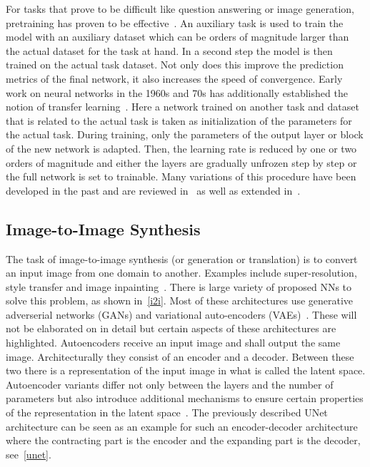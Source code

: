 For tasks that prove to be difficult like question answering or image generation, pretraining has proven to be effective~\autocite{radford_improving_nodate, wang_pretraining_2022}.
An auxiliary task is used to train the model with an auxiliary dataset which can be orders of magnitude larger than the actual dataset for the task at hand.
In a second step the model is then trained on the actual task dataset.
Not only does this improve the prediction metrics of the final network, it also increases the speed of convergence.
Early work on neural networks in the 1960s and 70s has additionally established the notion of transfer learning~\autocite{bozinovski_reminder_2020}.
Here a network trained on another task and dataset that is related to the actual task is taken as initialization of the parameters for the actual task.
During training, only the parameters of the output layer or block of the new network is adapted.
Then, the learning rate is reduced by one or two orders of magnitude and either the layers are gradually unfrozen step by step or the full network is set to trainable.
Many variations of this procedure have been developed in the past and are reviewed in~\autocite{peters_tune_2019} as well as extended in~\autocite{dale_fine-tuning_2024}.

\subsection{Image-to-Image Synthesis}
The task of image-to-image synthesis (or generation or translation) is to convert an input image from one domain to another.
Examples include super-resolution, style transfer and image inpainting~\autocite{pang_image-image_2021}.
There is large variety of proposed NNs to solve this problem, as shown in~\ref{i2i}.
Most of these architectures use generative adverserial networks (GANs) and variational auto-encoders (VAEs)~\autocite{goodfellow_generative_2020, kingma_auto-encoding_2022}.
These will not be elaborated on in detail but certain aspects of these architectures are highlighted.
Autoencoders receive an input image and shall output the same image.
Architecturally they consist of an encoder and a decoder.
Between these two there is a representation of the input image in what is called the latent space.
Autoencoder variants differ not only between the layers and the number of parameters but also introduce additional mechanisms to ensure certain properties of the representation in the latent space~\autocite{goodfellow_deep_2016}.
The previously described UNet architecture can be seen as an example for such an encoder-decoder architecture where the contracting part is the encoder and the expanding part is the decoder, see~\ref{unet}. \\

